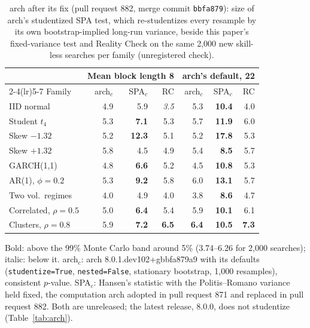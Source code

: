\begin{table}[t]
\centering
\footnotesize
\setlength{\tabcolsep}{3.5pt}
\caption{arch after its fix (pull request 882, merge commit \texttt{bbfa879}): size of arch's studentized SPA test, which re-studentizes every resample by its own bootstrap-implied long-run variance, beside this paper's fixed-variance test and Reality Check on the same 2{,}000 new skill-less searches per family (unregistered check).}
\label{tab:arch882}
\begin{tabular}{lrrrrrr}
\toprule
 & \multicolumn{3}{c}{Mean block length 8} & \multicolumn{3}{c}{arch's default, 22} \\
\cmidrule(lr){2-4}\cmidrule(lr){5-7}
Family & arch$_c$ & SPA$_c$ & RC & arch$_c$ & SPA$_c$ & RC \\
\midrule
IID normal & 4.9 & 5.9 & \textit{3.5} & 5.3 & \textbf{10.4} & 4.0 \\
Student $t_4$ & 5.3 & \textbf{7.1} & 5.3 & 5.7 & \textbf{11.9} & 6.0 \\
Skew $-1.32$ & 5.2 & \textbf{12.3} & 5.1 & 5.2 & \textbf{17.8} & 5.3 \\
Skew $+1.32$ & 5.8 & 4.5 & 4.9 & 5.4 & \textbf{8.5} & 5.7 \\
GARCH(1,1) & 4.8 & \textbf{6.6} & 5.2 & 4.5 & \textbf{10.8} & 5.3 \\
AR(1), $\phi=0.2$ & 5.3 & \textbf{9.2} & 5.8 & 6.0 & \textbf{13.1} & 5.7 \\
Two vol.\ regimes & 4.0 & 4.9 & 4.0 & 3.8 & \textbf{8.6} & 4.7 \\
Correlated, $\rho=0.5$ & 5.0 & \textbf{6.4} & 5.4 & 5.9 & \textbf{10.1} & 6.1 \\
Clusters, $\rho=0.8$ & 5.9 & \textbf{7.2} & \textbf{6.5} & \textbf{6.4} & \textbf{10.5} & \textbf{7.3} \\
\bottomrule
\end{tabular}
\par\smallskip\begin{minipage}{0.97\linewidth}\footnotesize Bold: above the 99\% Monte Carlo band around 5\% (3.74--6.26 for 2{,}000 searches); italic: below it. arch$_c$: arch 8.0.1.dev102{+}gbbfa879a9 with its defaults (\texttt{studentize=True}, \texttt{nested=False}, stationary bootstrap, 1{,}000 resamples), consistent $p$-value. SPA$_c$: Hansen's statistic with the Politis--Romano variance held fixed, the computation arch adopted in pull request 871 and replaced in pull request 882. Both are unreleased; the latest release, 8.0.0, does not studentize (Table~\ref{tab:arch}).\end{minipage}
\end{table}

